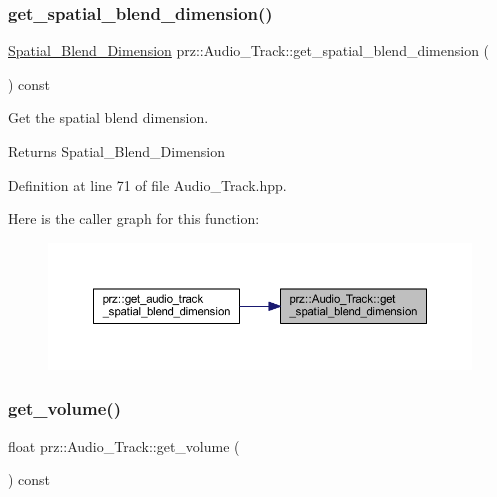 \subsubsection{\texorpdfstring{get\_spatial\_blend\_dimension()}{get\_spatial\_blend\_dimension()}}
{\footnotesize\ttfamily \mbox{\hyperlink{classprz_1_1_audio___track_a4fb1dc3dd45713ba4c3e56918721d12a}{Spatial\+\_\+\+Blend\+\_\+\+Dimension}} prz\+::\+Audio\+\_\+\+Track\+::get\+\_\+spatial\+\_\+blend\+\_\+dimension (\begin{DoxyParamCaption}{ }\end{DoxyParamCaption}) const\hspace{0.3cm}{\ttfamily [inline]}}



Get the spatial blend dimension. 

\begin{DoxyReturn}{Returns}
Spatial\+\_\+\+Blend\+\_\+\+Dimension 
\end{DoxyReturn}


Definition at line 71 of file Audio\+\_\+\+Track.\+hpp.

Here is the caller graph for this function\+:
\nopagebreak
\begin{figure}[H]
\begin{center}
\leavevmode
\includegraphics[width=350pt]{classprz_1_1_audio___track_ac10fc428fddc350fb7e6b4d29d287a3a_icgraph}
\end{center}
\end{figure}
\mbox{\label{classprz_1_1_audio___track_ad3a1f86e10f7e128a5589b621ff28b45}} 
\subsubsection{\texorpdfstring{get\_volume()}{get\_volume()}}
{\footnotesize\ttfamily float prz\+::\+Audio\+\_\+\+Track\+::get\+\_\+volume (\begin{DoxyParamCaption}{ }\end{DoxyParamCaption}) const\hspace{0.3cm}{\ttfamily [inline]}}



